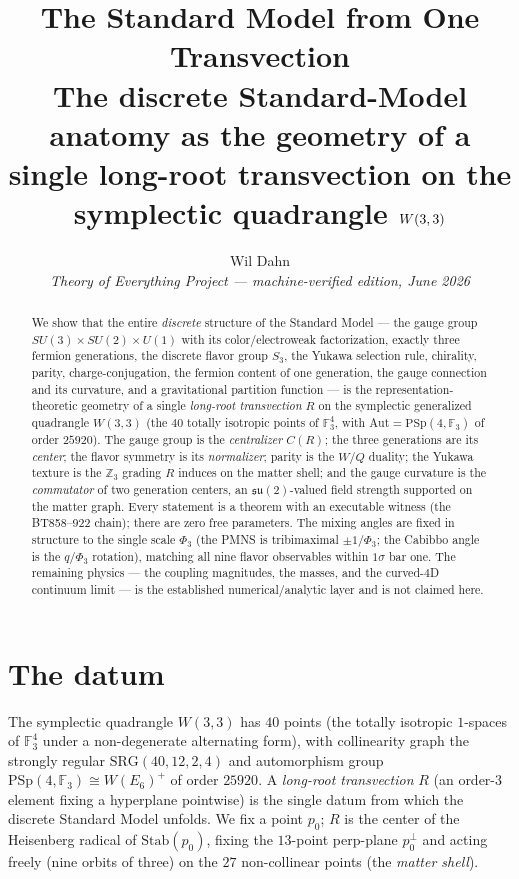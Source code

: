 \documentclass[11pt]{article}
\title{\textbf{The Standard Model from One Transvection}\\[4pt]
\large The discrete Standard-Model anatomy as the geometry of a single
long-root transvection on the symplectic quadrangle $\W$}
\author{Wil Dahn\\[2pt]
\normalsize\textit{Theory of Everything Project --- machine-verified
edition, June 2026}}
\date{}
\newcommand{\W}{W(3,3)}
\newcommand{\GF}[1]{\mathbb{F}_{#1}}
\newcommand{\PSp}{\mathrm{PSp}}
\newcommand{\Z}{\mathbb{Z}}
\begin{document}
\maketitle

\begin{abstract}
We show that the entire \emph{discrete} structure of the Standard Model
--- the gauge group $SU(3)\times SU(2)\times U(1)$ with its
color/electroweak factorization, exactly three fermion generations, the
discrete flavor group $S_3$, the Yukawa selection rule, chirality,
parity, charge-conjugation, the fermion content of one generation, the
gauge connection and its curvature, and a gravitational partition
function --- is the representation-theoretic geometry of a single
\emph{long-root transvection} $R$ on the symplectic generalized
quadrangle $\W$ (the $40$ totally isotropic points of $\GF3^4$, with
$\mathrm{Aut}=\PSp(4,\GF3)$ of order $25920$). The gauge group is the
\emph{centralizer} $C(R)$; the three generations are its \emph{center};
the flavor symmetry is its \emph{normalizer}; parity is the $W/Q$
duality; the Yukawa texture is the $\Z_3$ grading $R$ induces on the
matter shell; and the gauge curvature is the \emph{commutator} of two
generation centers, an $\mathfrak{su}(2)$-valued field strength
supported on the matter graph. Every statement is a theorem with an
executable witness (the BT858--922 chain); there are zero free
parameters. The mixing angles are fixed in structure to the single
scale $\Phi_3$ (the PMNS is tribimaximal $\pm 1/\Phi_3$; the Cabibbo
angle is the $q/\Phi_3$ rotation), matching all nine flavor
observables within $1\sigma$ bar one. The remaining physics --- the
coupling magnitudes, the masses, and the curved-$4$D continuum limit
--- is the established numerical/analytic layer and is not claimed
here.
\end{abstract}

\section{The datum}
The symplectic quadrangle $\W$ has $40$ points (the totally isotropic
$1$-spaces of $\GF3^4$ under a non-degenerate alternating form), with
collinearity graph the strongly regular $\mathrm{SRG}(40,12,2,4)$ and
automorphism group $\PSp(4,\GF3)\cong W(E_6)^{+}$ of order $25920$. A
\emph{long-root transvection} $R$ (an order-$3$ element fixing a
hyperplane pointwise) is the single datum from which the discrete
Standard Model unfolds. We fix a point $p_0$; $R$ is the center of the
Heisenberg radical of $\mathrm{Stab}(p_0)$, fixing the $13$-point
perp-plane $p_0^{\perp}$ and acting freely (nine orbits of three) on the
$27$ non-collinear points (the \emph{matter shell}).
\end{document}
